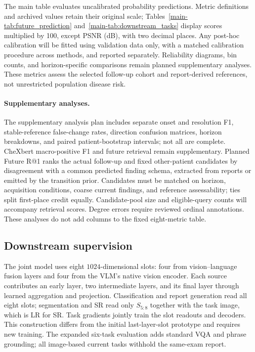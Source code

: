 The main table evaluates uncalibrated probability predictions. Metric definitions
and archived values retain their original scale; Tables~\ref{main-tab:future_prediction}
and~\ref{main-tab:downstream_tasks} display scores multiplied by 100, except PSNR
(dB), with two decimal places. Any post-hoc calibration will be fitted using validation data only, with a matched calibration procedure across methods, and reported separately. Reliability diagrams, bin counts, and horizon-specific comparisons remain planned supplementary analyses. These metrics assess the selected follow-up cohort and report-derived references, not unrestricted population disease risk.

\paragraph{Supplementary analyses.}
The supplementary analysis plan includes separate onset and resolution F1,
stable-reference false-change rates, direction confusion matrices, horizon
breakdowns, and paired patient-bootstrap intervals; not all are complete.
CheXbert macro-positive F1 and future retrieval remain supplementary. Planned
Future R@1 ranks the actual follow-up and fixed other-patient candidates by
disagreement with a common predicted finding schema, extracted from reports or
emitted by the transition prior. Candidates must be matched on horizon,
acquisition conditions, coarse current findings, and reference assessability;
ties split first-place credit equally. Candidate-pool size and eligible-query
counts will accompany retrieval scores. Degree errors require reviewed ordinal
annotations. These analyses do not add columns to the fixed eight-metric table.

\subsection{Downstream supervision}

The joint model uses eight $1024$-dimensional slots: four from vision--language fusion layers and four from the VLM's native vision encoder. Each source contributes an early layer, two intermediate layers, and its final layer through learned aggregation and projection. Classification and report generation read all eight slots; segmentation and SR read only $S_{5:8}$ together with the task image, which is LR for SR. Task gradients jointly train the slot readouts and decoders. This construction differs from the initial last-layer-slot prototype and requires new training. The expanded six-task evaluation adds standard VQA and phrase grounding; all image-based current tasks withhold the same-exam report.

